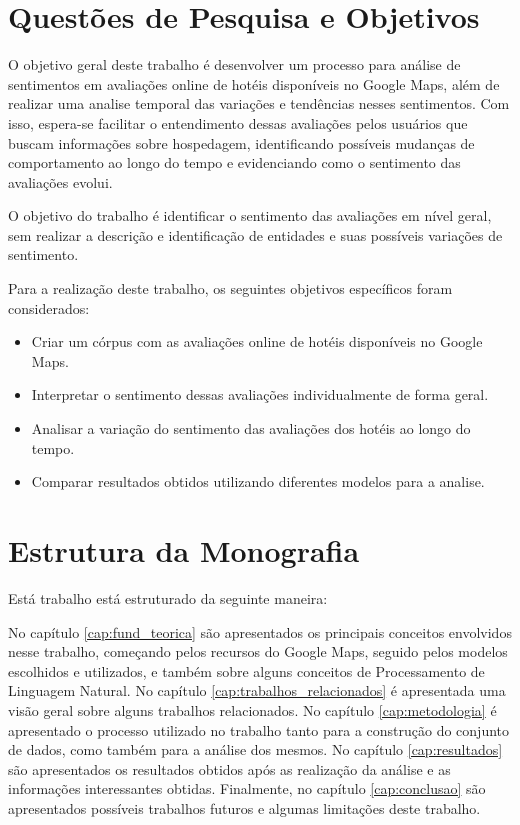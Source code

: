 \section{Questões de Pesquisa e Objetivos}


O objetivo geral deste trabalho é desenvolver um processo para   análise de sentimentos em avaliações online de hotéis disponíveis no Google Maps, além de realizar uma analise temporal das variações e tendências nesses sentimentos. Com isso, espera-se facilitar o entendimento dessas avaliações pelos usuários que buscam informações sobre hospedagem, identificando possíveis mudanças de comportamento ao longo do tempo e evidenciando como o sentimento das avaliações evolui.

O objetivo do trabalho é identificar o sentimento das avaliações em nível geral, sem realizar a descrição e identificação de entidades e suas possíveis variações de sentimento.

Para a realização deste trabalho, os seguintes objetivos específicos foram considerados:

\begin{itemize}
	\item Criar um córpus com as avaliações online de hotéis disponíveis no Google Maps.
	\item Interpretar o sentimento dessas avaliações individualmente de forma geral.
	\item Analisar a variação do sentimento das avaliações dos hotéis ao longo do tempo.
	\item Comparar resultados obtidos utilizando diferentes modelos para a analise.
\end{itemize}


\section{Estrutura da Monografia}

Está trabalho está estruturado da seguinte maneira: 

No capítulo \ref{cap:fund_teorica} são apresentados os principais conceitos envolvidos nesse trabalho, começando pelos recursos do Google Maps, seguido pelos modelos escolhidos e utilizados, e também sobre alguns conceitos de Processamento de Linguagem Natural. No capítulo \ref{cap:trabalhos_relacionados} é apresentada uma visão geral sobre alguns trabalhos relacionados. No capítulo \ref{cap:metodologia} é apresentado o processo utilizado no trabalho tanto para a construção do conjunto de dados, como também para a análise dos mesmos. No capítulo \ref{cap:resultados} são apresentados os resultados obtidos após as realização da análise e as informações interessantes obtidas. Finalmente, no capítulo \ref{cap:conclusao} são apresentados possíveis trabalhos futuros e algumas limitações deste trabalho.
